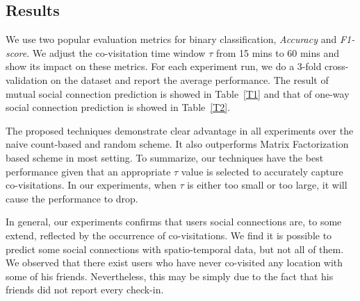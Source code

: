 \subsection{Results}

We use two popular evaluation metrics for binary classification, \textit{Accuracy} and \textit{F1-score}. We adjust the co-visitation time window $\tau$ from 15 mins to 60 mins and show its impact on these metrics. For each experiment run, we do a 3-fold cross-validation on the dataset and report the average performance. The result of mutual social connection prediction is showed in Table~\ref{T1} and that of one-way social connection prediction is showed in Table~\ref{T2}.

The proposed techniques demonstrate clear advantage in all experiments over the naive count-based and random scheme. It also outperforms Matrix Factorization based scheme in most setting. To summarize, our techniques have the best performance given that an appropriate $\tau$ value is selected to accurately capture co-visitations. In our experiments, when $\tau$ is either too small or too large, it will cause the performance to drop.

In general, our experiments confirms that users social connections are, to some extend, reflected by the occurrence of co-visitations. We find it is possible to predict some social connections with spatio-temporal data, but not all of them. We observed that there exist users who have never co-visited any location with some of his friends. Nevertheless, this may be simply due to the fact that his friends did not report every check-in.